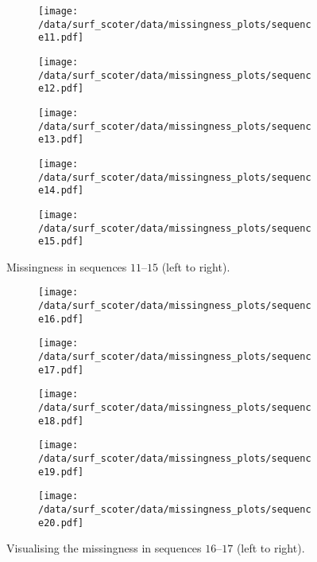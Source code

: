 \begin{figure}[b]
	\begin{subfigure}[b]{0.2\textwidth}
		\texttt{[image: /data/surf\_scoter/data/missingness\_plots/sequence11.pdf]}
	\end{subfigure}%
	\begin{subfigure}[b]{0.2\textwidth}
		\texttt{[image: /data/surf\_scoter/data/missingness\_plots/sequence12.pdf]}
	\end{subfigure}%
	\begin{subfigure}[b]{0.2\textwidth}
		\texttt{[image: /data/surf\_scoter/data/missingness\_plots/sequence13.pdf]}
	\end{subfigure}%
	\begin{subfigure}[b]{0.2\textwidth}
		\texttt{[image: /data/surf\_scoter/data/missingness\_plots/sequence14.pdf]}
	\end{subfigure}%
	\begin{subfigure}[b]{0.2\textwidth}
		\texttt{[image: /data/surf\_scoter/data/missingness\_plots/sequence15.pdf]}
	\end{subfigure}%
	\caption{Missingness in sequences $11$--$15$ (left to right).}
\end{figure}

\begin{figure}[t]
	\begin{subfigure}[b]{0.2\textwidth}
		\texttt{[image: /data/surf\_scoter/data/missingness\_plots/sequence16.pdf]}
	\end{subfigure}%
	\begin{subfigure}[b]{0.2\textwidth}
		\texttt{[image: /data/surf\_scoter/data/missingness\_plots/sequence17.pdf]}
	\end{subfigure}%
	\begin{subfigure}[b]{0.2\textwidth}
		\texttt{[image: /data/surf\_scoter/data/missingness\_plots/sequence18.pdf]}
	\end{subfigure}%
	\begin{subfigure}[b]{0.2\textwidth}
		\texttt{[image: /data/surf\_scoter/data/missingness\_plots/sequence19.pdf]}
	\end{subfigure}%
	\begin{subfigure}[b]{0.2\textwidth}
		\texttt{[image: /data/surf\_scoter/data/missingness\_plots/sequence20.pdf]}
	\end{subfigure}%
	\caption{Visualising the missingness in sequences $16$--$17$ (left to right).}
\end{figure}

